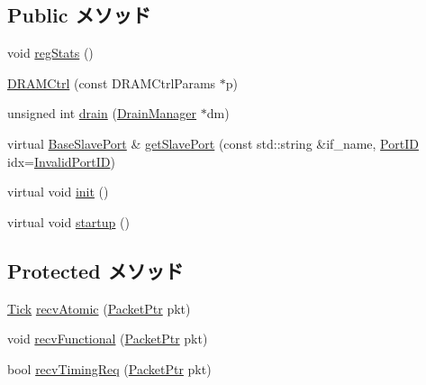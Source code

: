\subsection*{Public メソッド}
\begin{DoxyCompactItemize}
\item 
void \hyperlink{classDRAMCtrl_a4dc637449366fcdfc4e764cdf12d9b11}{regStats} ()
\item 
\hyperlink{classDRAMCtrl_af86a9f0ba5b3737e1a7ba1f97dbf0e91}{DRAMCtrl} (const DRAMCtrlParams $\ast$p)
\item 
unsigned int \hyperlink{classDRAMCtrl_aa8a18d230dba7a674ac8a0b4f35bc36a}{drain} (\hyperlink{classDrainManager}{DrainManager} $\ast$dm)
\item 
virtual \hyperlink{classBaseSlavePort}{BaseSlavePort} \& \hyperlink{classDRAMCtrl_a4edba7d5e567b66fcd93297802a97077}{getSlavePort} (const std::string \&if\_\-name, \hyperlink{base_2types_8hh_acef4d7d41cb21fdc252e20c04cd7bb8e}{PortID} idx=\hyperlink{base_2types_8hh_a65bf40f138cf863f0c5e2d8ca1144126}{InvalidPortID})
\item 
virtual void \hyperlink{classDRAMCtrl_a02fd73d861ef2e4aabb38c0c9ff82947}{init} ()
\item 
virtual void \hyperlink{classDRAMCtrl_aecc7d8debf54990ffeaaed5bac7d7d81}{startup} ()
\end{DoxyCompactItemize}
\subsection*{Protected メソッド}
\begin{DoxyCompactItemize}
\item 
\hyperlink{base_2types_8hh_a5c8ed81b7d238c9083e1037ba6d61643}{Tick} \hyperlink{classDRAMCtrl_a5f0b4c4a94f6b0053f9d7a4eb9c2518a}{recvAtomic} (\hyperlink{classPacket}{PacketPtr} pkt)
\item 
void \hyperlink{classDRAMCtrl_aeefa907fb6d6a787e6dab90e8138ea90}{recvFunctional} (\hyperlink{classPacket}{PacketPtr} pkt)
\item 
bool \hyperlink{classDRAMCtrl_a3344d9dd0f83257feab5424e761f31c6}{recvTimingReq} (\hyperlink{classPacket}{PacketPtr} pkt)
\end{DoxyCompactItemize}
